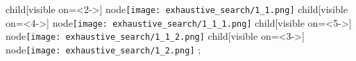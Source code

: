 child[visible on=<2->]{
    node{\texttt{[image: exhaustive\_search/1\_1.png]}}
    child[visible on=<4->]{
        node{\texttt{[image: exhaustive\_search/1\_1\_1.png]}}
    } child[visible on=<5->]{
        node{\texttt{[image: exhaustive\_search/1\_1\_2.png]}}
    }
} child[visible on=<3->]{
    node{\texttt{[image: exhaustive\_search/1\_2.png]}}
};